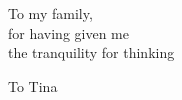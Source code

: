 \thispagestyle{empty}
\begin{flushright}
    \null{}
        To my family,\\for having given me\\the tranquility for thinking
    \null
\end{flushright}
\vspace{-1.4\textwidth}
\begin{flushright}
    \null{}
        To Tina
    \null
\end{flushright}
